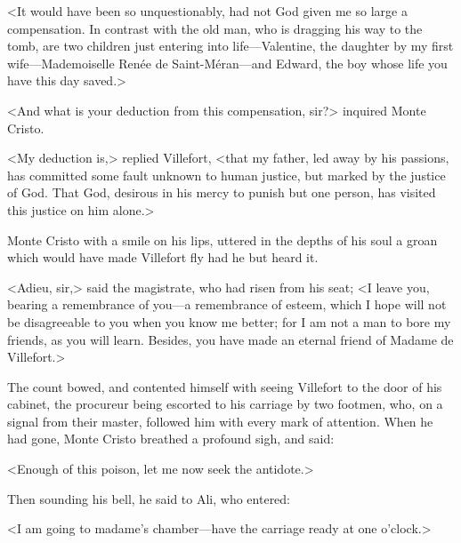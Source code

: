  <It would have been so unquestionably, had not God given me so large a compensation. In contrast with the old man, who is dragging his way to the tomb, are two children just entering into life—Valentine, the daughter by my first wife—Mademoiselle Renée de Saint-Méran—and Edward, the boy whose life you have this day saved.> 

 <And what is your deduction from this compensation, sir?> inquired Monte Cristo. 

 <My deduction is,> replied Villefort, <that my father, led away by his passions, has committed some fault unknown to human justice, but marked by the justice of God. That God, desirous in his mercy to punish but one person, has visited this justice on him alone.> 

 Monte Cristo with a smile on his lips, uttered in the depths of his soul a groan which would have made Villefort fly had he but heard it. 

 <Adieu, sir,> said the magistrate, who had risen from his seat; <I leave you, bearing a remembrance of you—a remembrance of esteem, which I hope will not be disagreeable to you when you know me better; for I am not a man to bore my friends, as you will learn. Besides, you have made an eternal friend of Madame de Villefort.> 

 The count bowed, and contented himself with seeing Villefort to the door of his cabinet, the procureur being escorted to his carriage by two footmen, who, on a signal from their master, followed him with every mark of attention. When he had gone, Monte Cristo breathed a profound sigh, and said: 

 <Enough of this poison, let me now seek the antidote.> 

 Then sounding his bell, he said to Ali, who entered: 

 <I am going to madame's chamber—have the carriage ready at one o'clock.> 